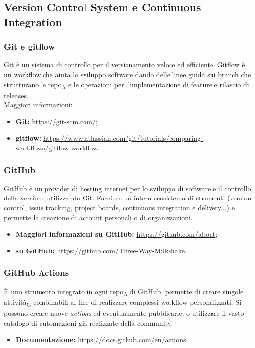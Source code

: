 \subsection{Version Control System e Continuous Integration}

\subsubsection{Git e gitflow}
Git è un sistema di controllo per il versionamento veloce ed efficiente. Gitflow è un workflow che aiuta lo sviluppo software dando delle linee guida sui branch che strutturano le repo\textsubscript{A} e le operazioni per l'implementazione di feature e rilascio di releases.\\
Maggiori informazioni:
\begin{itemize}
    \item \textbf{Git: }\url{https://git-scm.com/};
    \item \textbf{gitflow: }\url{https://www.atlassian.com/git/tutorials/comparing-workflows/gitflow-workflow}.
\end{itemize}

\subsubsection{GitHub}
GitHub è un provider di hosting internet per lo sviluppo di software e il controllo della versione utilizzando Git. Fornisce un intero ecosistema di strumenti (version control, issue tracking, project boards, continuous integration e delivery...) e permette la creazione di account personali o di organizzazioni.
\begin{itemize}
    \item \textbf{Maggiori informazioni su GitHub:} \url{https://github.com/about};
    \item \textbf{\group{} su GitHub: }\url{https://github.com/Three-Way-Milkshake}.
\end{itemize}

\subsubsection{GitHub Actions}
È uno strumento integrato in ogni repo\textsubscript{A} di GitHub, permette di creare singole attività\textsubscript{G} combinabili al fine di realizzare complessi workflow personalizzati. 
Si possono creare nuove \textit{actions} ed eventualmente pubblicarle, o utilizzare il vasto catalogo di automazioni già realizzate dalla community.
\begin{itemize}
    \item \textbf{Documentazione: } \url{https://docs.github.com/en/actions}.
\end{itemize}